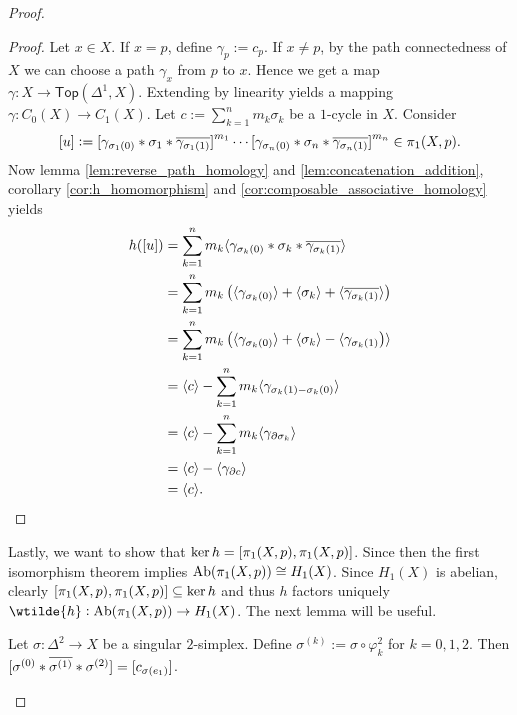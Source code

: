 \begin{proof}
	\begin{proof}
		Let $x \in X$. If $x = p$, define $\gamma_p := c_p$. If $x \neq p$, by the path connectedness of $X$ we can choose a path $\gamma_x$ from $p$ to $x$. Hence we get a map $\gamma : X \to \mathsf{Top}(\Delta^1,X)$. Extending by linearity yields a mapping $\gamma : C_0(X) \to C_1(X)$. Let $c := \sum_{k = 1}^n m_k \sigma_k$ be a $1$-cycle in $X$. Consider
		\begin{equation*}
			\sbr{u} := \sbr[0]{\gamma_{\sigma_1(0)} \ast \sigma_1 \ast \overline{\gamma_{\sigma_1(1)}}}^{m_1} \cdots \sbr[0]{\gamma_{\sigma_n(0)} \ast \sigma_n \ast \overline{\gamma_{\sigma_n(1)}}}^{m_n} \in \pi_1(X,p). 
		\end{equation*}
		Now lemma \ref{lem:reverse_path_homology} and \ref{lem:concatenation_addition}, corollary \ref{cor:h_homomorphism} and \ref{cor:composable_associative_homology} yields
		\begin{align*}
			h(\sbr{u}) &= \sum_{k = 1}^n m_k \langle\gamma_{\sigma_k(0)} \ast \sigma_k \ast \overline{\gamma_{\sigma_k(1)}}\rangle\\
			&= \sum_{k = 1}^n m_k \del[1]{\langle\gamma_{\sigma_k(0)}\rangle + \langle\sigma_k\rangle + \langle \overline{\gamma_{\sigma_k(1)}}\rangle}\\
			&= \sum_{k = 1}^n m_k \del[1]{\langle\gamma_{\sigma_k(0)}\rangle + \langle\sigma_k\rangle - \langle \gamma_{\sigma_k(1)}}\rangle\\
			&= \langle c \rangle - \sum_{k = 1}^n m_k \langle \gamma_{\sigma_k(1) - \sigma_k(0)}\rangle\\
			&= \langle c \rangle - \sum_{k = 1}^n m_k \langle \gamma_{\partial \sigma_k}\rangle\\
			&= \langle c \rangle - \langle \gamma_{\partial c}\rangle\\
			&= \langle c \rangle.
		\end{align*}
	\end{proof}

	Lastly, we want to show that $\ker h = \sbr[0]{\pi_1(X,p),\pi_1(X,p)}$. Since then the first isomorphism theorem implies $\operatorname{Ab}(\pi_1(X,p)) \cong H_1(X)$. Since $H_1(X)$ is abelian, clearly $\sbr[0]{\pi_1(X,p),\pi_1(X,p)} \subseteq \ker h$ and thus $h$ factors uniquely $\wtilde{h} : \Ab(\pi_1(X,p)) \to H_1(X)$. The next lemma will be useful.
	
	\begin{lemma}
		Let $\sigma : \Delta^2 \to X$ be a singular $2$-simplex. Define $\sigma^{(k)} := \sigma \circ \varphi^2_k$ for $k = 0,1,2$. Then $\sbr[0]{\sigma^{(0)} \ast \overline{\sigma^{(1)}} \ast \sigma^{(2)}} = \sbr[0]{c_{\sigma(e_1)}}$.
		\label{lem:nullhomotopic_loop}
	\end{lemma}


\end{proof}
